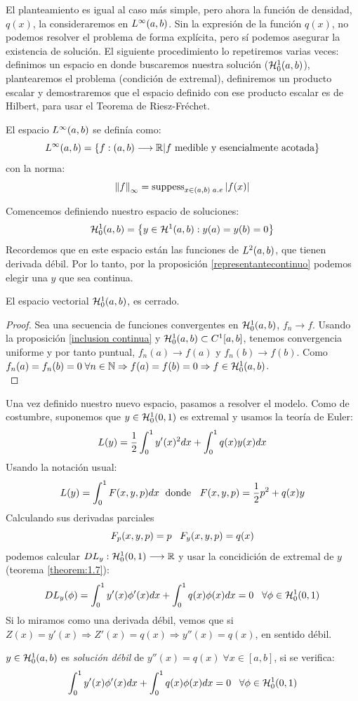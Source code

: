 El planteamiento es igual al caso más simple, pero ahora la función de densidad, $q(x)$, la consideraremos en $\lebesgue{\infty}$. Sin la expresión de la función $q(x)$, no podemos resolver el problema de forma explícita, pero sí podemos asegurar la existencia de solución. El siguiente procedimiento lo repetiremos varias veces: definimos un espacio en donde buscaremos nuestra solución ($\sobolevcero{1}$), plantearemos el problema (condición de extremal), definiremos un producto escalar y demostraremos que el espacio definido con ese producto escalar es de Hilbert, para usar el Teorema de Riesz-Fréchet.

\begin{remark}
El espacio $\lebesgue{\infty}$ se definía como:
\[
\lebesgue{\infty}=\{\funcion{f}{(a,b)}{\R}|f\text{ medible y esencialmente acotada}\}
\]
con la norma:
\[
\norm{f}_\infty = \suppess_{x\in(a,b)\;a.e}|f(x)|
\]
\end{remark}

Comencemos definiendo nuestro espacio de soluciones:
\[
\sobolevcero[a,b]{1}=\conjunto{y\in\sobolev{1}: y(a)=y(b)=0}
\]
Recordemos que en este espacio están las funciones de $\lebesgue{2}$, que tienen derivada débil. Por lo tanto, por la proposición \ref{representantecontinuo} podemos elegir una $y$ que sea continua.
\begin{prop}
El espacio vectorial $\sobolevcero{1}$, es cerrado.
\end{prop}   
\begin{proof}
Sea una secuencia de funciones convergentes en $\sobolevcero{1}$, $f_n\longrightarrow f$. Usando la proposición \ref{inclusion continua} y $\sobolevcero{1}\subset C^{1}[a,b]$, tenemos convergencia uniforme y por tanto puntual, $f_n(a)\longrightarrow f(a)$ y $f_n(b)\longrightarrow f(b)$. Como $f_n(a)=f_n(b)=0 \;\forall n\in\N \Rightarrow f(a)=f(b)=0 \Rightarrow f\in\sobolevcero{1}$.\\
\end{proof}

Una vez definido nuestro nuevo espacio, pasamos a resolver el modelo. Como de costumbre, suponemos que $y\in\sobolevcero[0,1]{1}$ es extremal y usamos la teoría de Euler:
\[
L(y)=\frac{1}{2}\integral{0}{1}{y'(x)^2dx}+\integral{0}{1}{q(x)y(x)dx}
\]
Usando la notación usual:
\[
L(y)=\integral{0}{1}{F(x,y,p)dx} \; \text{ donde } \;\; F(x,y,p)=\frac{1}{2}p^2+q(x)y
\]
Calculando sus derivadas parciales
\[
F_p(x,y,p)=p \espacio F_y(x,y,p)=q(x)
\]
podemos calcular $\funcion{DL_y}{\sobolevcero[0,1]{1}}{\R}$ y usar la concidición de extremal de $y$ (teorema \ref{theorem:1.7}):
\[
DL_y(\phi)=\integral{0}{1}{y'(x)\phi'(x)dx}+\integral{0}{1}{q(x)\phi(x)dx}=0 \espacio \forall \phi\in\sobolevcero[0,1]{1}
\]
Si lo miramos como una derivada débil, vemos que si $Z(x)=y'(x) \Rightarrow Z'(x)=q(x) \Rightarrow y''(x)=q(x)$, en sentido débil.
\begin{definition}
\label{soluciondebil}
$y\in\sobolevcero{1}$ es \textit{solución débil} de $y''(x)=q(x) \; \forall x 
\in [a,b]$, si se verifica:
\[
\integral{0}{1}{y'(x)\phi'(x)dx}+\integral{0}{1}{q(x)\phi(x)dx}=0 \espacio \forall \phi\in\sobolevcero[0,1]{1}
\]
\end{definition}

